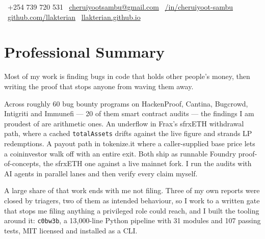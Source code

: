 \documentclass[10pt,a4paper]{article}
\begin{document}
\begin{center}
  {\sffamily\bfseries\fontsize{30}{34}\selectfont{}\par}
  \vspace{0.35em}
  {\sffamily{}\par}
  \vspace{0.55em}
  \small
  {\faPhone}\ +254 739 720 531 \quad
  {\faEnvelope}\ \href{mailto:cheruiyootsambu@gmail.com}{cheruiyootsambu@gmail.com} \quad
  {\faLinkedin}\ \href{https://linkedin.com/in/cheruiyoot-sambu}{/in/cheruiyoot-sambu} \\
  \vspace{0.3em}
  {\faGithub}\ \href{https://github.com/llakterian}{github.com/llakterian} \quad
  {\faGlobe}\ \href{https://llakterian.github.io}{llakterian.github.io}
\end{center}
\vspace{0.5em}

\section{Professional Summary}
\small
\setlength{\parskip}{0.5em}
Most of my work is finding bugs in code that holds other people's money, then writing the proof that stops anyone from waving them away.

Across roughly 60 bug bounty programs on HackenProof, Cantina, Bugcrowd, Intigriti and Immunefi --- 20 of them smart contract audits --- the findings I am proudest of are arithmetic ones. An underflow in Frax's sfrxETH withdrawal path, where a cached \texttt{totalAssets} drifts against the live figure and strands LP redemptions. A payout path in tokenize.it where a caller-supplied base price lets a coininvestor walk off with an entire exit. Both ship as runnable Foundry proof-of-concepts, the sfrxETH one against a live mainnet fork. I run the audits with AI agents in parallel lanes and then verify every claim myself.

A large share of that work ends with me not filing. Three of my own reports were closed by triagers, two of them as intended behaviour, so I work to a written gate that stops me filing anything a privileged role could reach, and I built the tooling around it: \texttt{c0bw3b}, a 13,000-line Python pipeline with 31 modules and 107 passing tests, MIT licensed and installed as a CLI.
\end{document}
